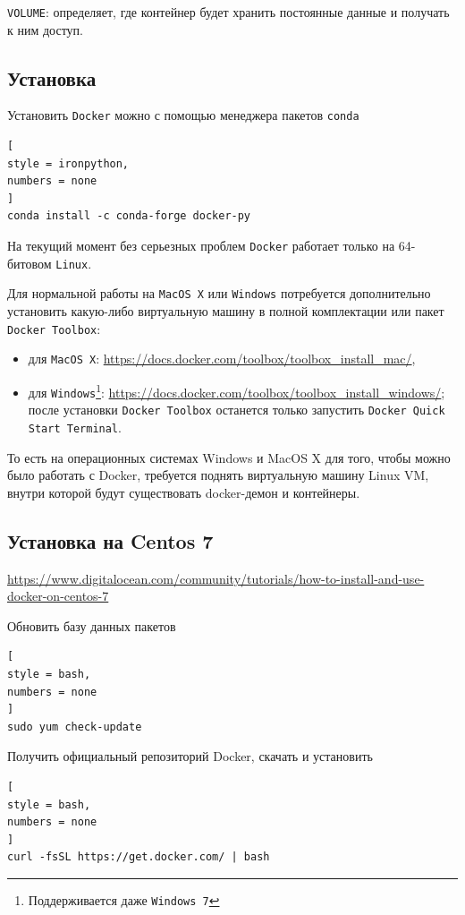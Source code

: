 \documentclass[%
	11pt,
	a4paper,
	utf8,
		]{article}
\begin{document}
\texttt{VOLUME}: определяет, где контейнер будет хранить постоянные данные и получать к ним доступ.

\subsection{Установка}

Установить \texttt{Docker} можно с помощью менеджера пакетов \texttt{conda}

\begin{lstlisting}[
style = ironpython,
numbers = none
]
conda install -c conda-forge docker-py
\end{lstlisting}

На текущий момент без серьезных проблем \texttt{Docker} работает только на 64-битовом \texttt{Linux}.

Для нормальной работы на \texttt{MacOS X} или \texttt{Windows} потребуется дополнительно установить какую-либо виртуальную машину в полной комплектации или пакет \texttt{Docker Toolbox}:

\begin{itemize}
	\item для \texttt{MacOS X}: \url{https://docs.docker.com/toolbox/toolbox_install_mac/},
	
	\item для \texttt{Windows}\footnote{Поддерживается даже \texttt{Windows 7}}: \url{https://docs.docker.com/toolbox/toolbox_install_windows/}; после установки \texttt{Docker Toolbox} останется только запустить \texttt{Docker Quick Start Terminal}.
\end{itemize}

То есть на операционных системах Windows и MacOS X для того, чтобы можно было работать с Docker, требуется поднять виртуальную машину Linux VM, внутри которой будут существовать docker-демон и контейнеры.

\subsection{Установка на Centos 7}

\url{https://www.digitalocean.com/community/tutorials/how-to-install-and-use-docker-on-centos-7}

Обновить базу данных пакетов
\begin{lstlisting}[
style = bash,
numbers = none
]
sudo yum check-update
\end{lstlisting}

Получить официальный репозиторий Docker, скачать и установить
\begin{lstlisting}[
style = bash,
numbers = none
]
curl -fsSL https://get.docker.com/ | bash
\end{lstlisting}
\end{document}
